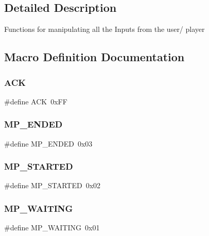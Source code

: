 \subsection{Detailed Description}
Functions for manipulating all the Inputs from the user/ player 

\subsection{Macro Definition Documentation}
\hypertarget{group___input_ga6f6489887e08bff4887d0bc5dcf214d8}{}\label{group___input_ga6f6489887e08bff4887d0bc5dcf214d8} 
\subsubsection{\texorpdfstring{A\+CK}{ACK}}
{\footnotesize\ttfamily \#define A\+CK~0x\+FF}

\hypertarget{group___input_gabf5d93e2b77034df4441eb3e448bfb95}{}\label{group___input_gabf5d93e2b77034df4441eb3e448bfb95} 
\subsubsection{\texorpdfstring{M\+P\+\_\+\+E\+N\+D\+ED}{MP\_ENDED}}
{\footnotesize\ttfamily \#define M\+P\+\_\+\+E\+N\+D\+ED~0x03}

\hypertarget{group___input_ga67d21ae11c5f3ce5f1445b40f7455731}{}\label{group___input_ga67d21ae11c5f3ce5f1445b40f7455731} 
\subsubsection{\texorpdfstring{M\+P\+\_\+\+S\+T\+A\+R\+T\+ED}{MP\_STARTED}}
{\footnotesize\ttfamily \#define M\+P\+\_\+\+S\+T\+A\+R\+T\+ED~0x02}

\hypertarget{group___input_ga1d7797eb18d53b8e2b78e4255bee6050}{}\label{group___input_ga1d7797eb18d53b8e2b78e4255bee6050} 
\subsubsection{\texorpdfstring{M\+P\+\_\+\+W\+A\+I\+T\+I\+NG}{MP\_WAITING}}
{\footnotesize\ttfamily \#define M\+P\+\_\+\+W\+A\+I\+T\+I\+NG~0x01}



